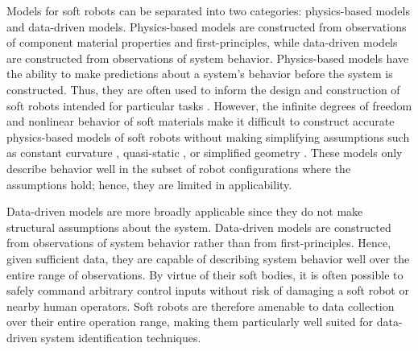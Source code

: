 Models for soft robots can be separated into two categories: physics-based models and data-driven models.
Physics-based models are constructed from observations of component material properties and first-principles, while data-driven models are constructed from observations of system behavior.
Physics-based models have the ability to make predictions about a system's behavior before the system is constructed.
Thus, they are often used to inform the design and construction of soft robots intended for particular tasks \cite{bishop2015design, bruder2018iros, renda2014dynamic, felt2018closed, neppalli2009closed}.
However, the infinite degrees of freedom and nonlinear behavior of soft materials make it difficult to construct accurate physics-based models of soft robots without making simplifying assumptions such as constant curvature \cite{webster2010design, jones2006kinematics}, quasi-static \cite{george2018control, gravagne2003large, trivedi2008geometrically}, or simplified geometry \cite{bruder2017model, sedal2017constitutive, bishop2012parallel}.
These models only describe behavior well in the subset of robot configurations where the assumptions hold; hence, they are limited in applicability.

Data-driven models are more broadly applicable since they do not make structural assumptions about the system.
Data-driven models are constructed from observations of system behavior rather than from first-principles.
Hence, given sufficient data, they are capable of describing system behavior well over the entire range of observations.
By virtue of their soft bodies, it is often possible to safely command arbitrary control inputs without risk of damaging a soft robot or nearby human operators.
Soft robots are therefore amenable to data collection over their entire operation range, making them particularly well suited for data-driven system identification techniques.

